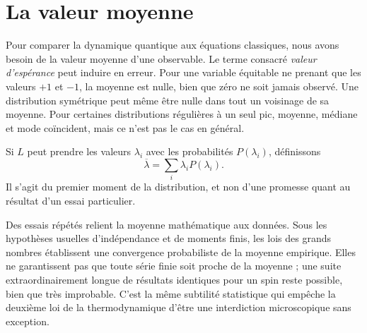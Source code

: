 \section{La valeur moyenne}

Pour comparer la dynamique quantique aux équations classiques, nous avons besoin de la valeur moyenne d’une observable. Le terme consacré \emph{valeur d’espérance} peut induire en erreur. Pour une variable équitable ne prenant que les valeurs \(+1\) et \(-1\), la moyenne est nulle, bien que zéro ne soit jamais observé. Une distribution symétrique peut même être nulle dans tout un voisinage de sa moyenne. Pour certaines distributions régulières à un seul pic, moyenne, médiane et mode coïncident, mais ce n’est pas le cas en général.

Si \(L\) peut prendre les valeurs \(\lambda_i\) avec les probabilités \(P(\lambda_i)\), définissons
\begin{equation}
\overline{\lambda}=\sum_i\lambda_iP(\lambda_i).
\label{eq:l4-probability-average}
\end{equation}
Il s’agit du premier moment de la distribution, et non d’une promesse quant au résultat d’un essai particulier.

\begin{classroomqa}
\end{classroomqa}

Des essais répétés relient la moyenne mathématique aux données. Sous les hypothèses usuelles d’indépendance et de moments finis, les lois des grands nombres établissent une convergence probabiliste de la moyenne empirique. Elles ne garantissent pas que toute série finie soit proche de la moyenne ; une suite extraordinairement longue de résultats identiques pour un spin reste possible, bien que très improbable. C’est la même subtilité statistique qui empêche la deuxième loi de la thermodynamique d’être une interdiction microscopique sans exception.

\begin{classroomqa}
\end{classroomqa}


